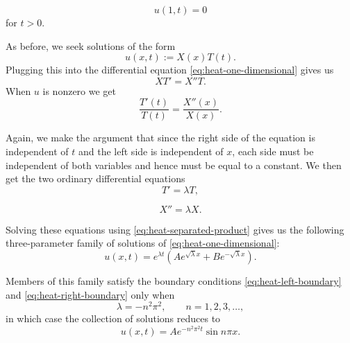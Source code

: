 \begin{equation}\label{eq:heat-right-boundary}
u(1,t)=0
\end{equation}
for $t>0$.

As before, we seek solutions of the form
\begin{equation}\label{eq:heat-separated-product}
u(x,t):=X(x)T(t).
\end{equation}
Plugging this into the differential equation \eqref{eq:heat-one-dimensional} gives us
\begin{equation}\label{eq:heat-product-substitution}
XT'=X''T.
\end{equation}
When $u$ is nonzero we get
\begin{equation}\label{eq:heat-separated-ratios}
\dfrac{T'(t)}{T(t)}=\dfrac{X''(x)}{X(x)}.
\end{equation}


Again, we make the argument that since the right side of the equation is independent of $t$ and the left side is independent of $x$, each side must be independent of both variables and hence must be equal to a constant. We then get the two ordinary differential equations
\begin{equation}\label{eq:heat-separated-time-equation}
T'=\lambda T,
\end{equation}

\begin{equation}\label{eq:heat-separated-space-equation}
X''=\lambda X.
\end{equation}


Solving these equations using \eqref{eq:heat-separated-product} gives us the following three-parameter family of solutions of \eqref{eq:heat-one-dimensional}:
\begin{equation}\label{eq:heat-three-parameter-family}
u(x,t)=e^{\lambda t}(Ae^{\sqrt{\lambda}x}+Be^{-\sqrt{\lambda}x}).
\end{equation}


Members of this family satisfy the boundary conditions \eqref{eq:heat-left-boundary} and \eqref{eq:heat-right-boundary} only when
\begin{equation}\label{eq:heat-boundary-eigenvalues}
\lambda=-n^2\pi^2,\qquad n=1,2,3,\ldots,
\end{equation}
in which case the collection of solutions reduces to
\begin{equation}\label{eq:heat-decaying-sine-modes}
u(x,t)=Ae^{-n^2\pi^2t}\sin n\pi x.
\end{equation}


